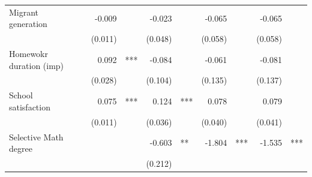 \documentclass{article}
\begin{document}
\begin{table}[!h]
\begin{tabular}{lllllllllll}
\multicolumn{1}{l}{Migrant generation} &
  \multicolumn{1}{r}{} &
  \multicolumn{1}{l}{} &
  \multicolumn{1}{r}{-0.009} &
  \multicolumn{1}{l}{} &
  \multicolumn{1}{r}{-0.023} &
  \multicolumn{1}{l}{} &
  \multicolumn{1}{r}{-0.065} &
  \multicolumn{1}{l}{} &
  \multicolumn{1}{r}{-0.065} &
  \multicolumn{1}{l}{} \\
\multicolumn{1}{l}{} &
  \multicolumn{1}{r}{} &
  \multicolumn{1}{l}{} &
  \multicolumn{1}{r}{(0.011)} &
  \multicolumn{1}{l}{} &
  \multicolumn{1}{r}{(0.048)} &
  \multicolumn{1}{l}{} &
  \multicolumn{1}{r}{(0.058)} &
  \multicolumn{1}{l}{} &
  \multicolumn{1}{r}{(0.058)} &
  \multicolumn{1}{l}{} \\
\multicolumn{1}{l}{Homewokr duration (imp)} &
  \multicolumn{1}{r}{} &
  \multicolumn{1}{l}{} &
  \multicolumn{1}{r}{0.092} &
  \multicolumn{1}{l}{***} &
  \multicolumn{1}{r}{-0.084} &
  \multicolumn{1}{l}{} &
  \multicolumn{1}{r}{-0.061} &
  \multicolumn{1}{l}{} &
  \multicolumn{1}{r}{-0.081} &
  \multicolumn{1}{l}{} \\
\multicolumn{1}{l}{} &
  \multicolumn{1}{r}{} &
  \multicolumn{1}{l}{} &
  \multicolumn{1}{r}{(0.028)} &
  \multicolumn{1}{l}{} &
  \multicolumn{1}{r}{(0.104)} &
  \multicolumn{1}{l}{} &
  \multicolumn{1}{r}{(0.135)} &
  \multicolumn{1}{l}{} &
  \multicolumn{1}{r}{(0.137)} &
  \multicolumn{1}{l}{} \\
\multicolumn{1}{l}{School satisfaction} &
  \multicolumn{1}{r}{} &
  \multicolumn{1}{l}{} &
  \multicolumn{1}{r}{0.075} &
  \multicolumn{1}{l}{***} &
  \multicolumn{1}{r}{0.124} &
  \multicolumn{1}{l}{***} &
  \multicolumn{1}{r}{0.078} &
  \multicolumn{1}{l}{} &
  \multicolumn{1}{r}{0.079} &
  \multicolumn{1}{l}{} \\
\multicolumn{1}{l}{} &
  \multicolumn{1}{r}{} &
  \multicolumn{1}{l}{} &
  \multicolumn{1}{r}{(0.011)} &
  \multicolumn{1}{l}{} &
  \multicolumn{1}{r}{(0.036)} &
  \multicolumn{1}{l}{} &
  \multicolumn{1}{r}{(0.040)} &
  \multicolumn{1}{l}{} &
  \multicolumn{1}{r}{(0.041)} &
  \multicolumn{1}{l}{} \\
\multicolumn{1}{l}{Selective Math degree} &
  \multicolumn{1}{r}{} &
  \multicolumn{1}{l}{} &
  \multicolumn{1}{r}{} &
  \multicolumn{1}{l}{} &
  \multicolumn{1}{r}{-0.603} &
  \multicolumn{1}{l}{**} &
  \multicolumn{1}{r}{-1.804} &
  \multicolumn{1}{l}{***} &
  \multicolumn{1}{r}{-1.535} &
  \multicolumn{1}{l}{***} \\
\multicolumn{1}{l}{} &
  \multicolumn{1}{r}{} &
  \multicolumn{1}{l}{} &
  \multicolumn{1}{r}{} &
  \multicolumn{1}{l}{} &
  \multicolumn{1}{r}{(0.212)} &

\end{tabular}
\end{table}
\end{document}
